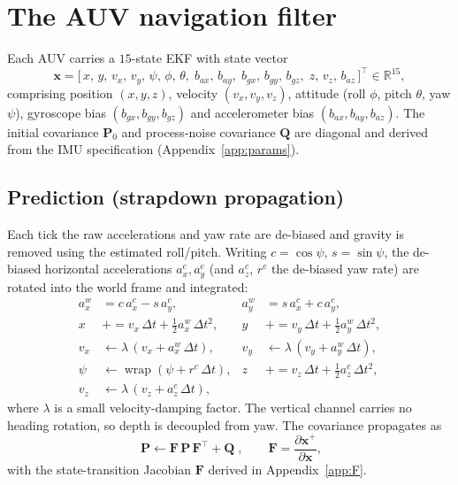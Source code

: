\documentclass[12pt,a4paper,oneside]{book}
\begin{document}
\section{The AUV navigation filter}
Each AUV carries a $15$-state EKF with state vector
\begin{equation}
\mathbf{x} = \big[\,x,\,y,\,v_x,\,v_y,\,\psi,\,\phi,\,\theta,\;
b_{ax},\,b_{ay},\;b_{gx},\,b_{gy},\,b_{gz},\;z,\,v_z,\,b_{az}\,\big]^{\!\top} \in \mathbb{R}^{15},
\label{eq:state}
\end{equation}
comprising position $(x,y,z)$, velocity $(v_x,v_y,v_z)$, attitude (roll $\phi$, pitch $\theta$, yaw
$\psi$), gyroscope bias $(b_{gx},b_{gy},b_{gz})$ and accelerometer bias $(b_{ax},b_{ay},b_{az})$. The
initial covariance $\mathbf{P}_0$ and process-noise covariance $\mathbf{Q}$ are diagonal and derived from
the IMU specification (Appendix~\ref{app:params}).

\subsection{Prediction (strapdown propagation)}
Each tick the raw accelerations and yaw rate are de-biased and gravity is removed using the estimated
roll/pitch. Writing $c=\cos\psi$, $s=\sin\psi$, the de-biased horizontal accelerations
$a_x^c,a_y^c$ (and $a_z^c$, $r^c$ the de-biased yaw rate) are rotated into the world frame and integrated:
\begin{align}
a_x^w &= c\,a_x^c - s\,a_y^c, & a_y^w &= s\,a_x^c + c\,a_y^c, \label{eq:rot}\\
x &\mathrel{+}= v_x\,\Delta t + \tfrac12 a_x^w\,\Delta t^2, &
y &\mathrel{+}= v_y\,\Delta t + \tfrac12 a_y^w\,\Delta t^2, \label{eq:pos}\\
v_x &\leftarrow \lambda\,(v_x + a_x^w\,\Delta t), &
v_y &\leftarrow \lambda\,(v_y + a_y^w\,\Delta t), \label{eq:vel}\\
\psi &\leftarrow \operatorname{wrap}(\psi + r^c\,\Delta t), &
z &\mathrel{+}= v_z\,\Delta t + \tfrac12 a_z^c\,\Delta t^2, \label{eq:psiz}\\
v_z &\leftarrow \lambda\,(v_z + a_z^c\,\Delta t), \label{eq:vz}
\end{align}
where $\lambda$ is a small velocity-damping factor. The vertical channel carries no heading rotation, so
depth is decoupled from yaw. The covariance propagates as
\begin{equation}
\boxed{\;\mathbf{P} \leftarrow \mathbf{F}\,\mathbf{P}\,\mathbf{F}^{\!\top} + \mathbf{Q}\;},
\qquad \mathbf{F}=\frac{\partial \mathbf{x}^{+}}{\partial \mathbf{x}},
\label{eq:covprop}
\end{equation}
with the state-transition Jacobian $\mathbf{F}$ derived in Appendix~\ref{app:F}.
\end{document}
